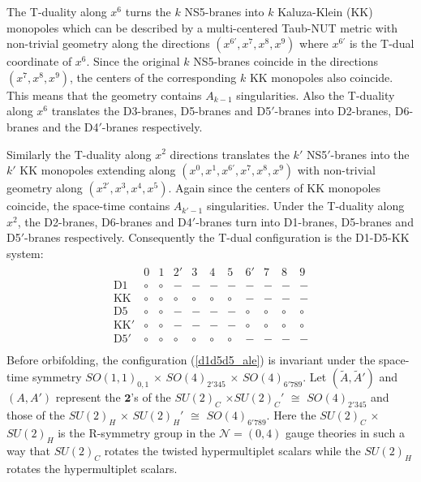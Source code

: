 \documentclass{article}
\numberwithin{equation}{section}
\begin{document}
The T-duality along $x^{6}$ turns the $k$ NS5-branes into $k$ Kaluza-Klein (KK) monopoles 
which can be described by a multi-centered Taub-NUT metric with non-trivial geometry along the directions $(x^{6'}, x^{7}, x^{8}, x^{9})$ 
where $x^{6'}$ is the T-dual coordinate of $x^{6}$. 
Since the original $k$ NS5-branes coincide in the directions $(x^{7}, x^{8}, x^{9})$, 
the centers of the corresponding $k$ KK monopoles also coincide. 
This means that the geometry contains $A_{k-1}$ singularities. 
Also the T-duality along $x^{6}$ translates the D3-branes, D5-branes and D5$'$-branes into 
D2-branes, D6-branes and the D4$'$-branes respectively. 

Similarly the T-duality along $x^{2}$ directions translates  
the $k'$ NS5$'$-branes into the $k'$ KK monopoles extending along $(x^{0}, x^{1}, x^{6'}, x^{7}, x^{8}, x^{9})$ 
with non-trivial geometry along $(x^{2'}, x^{3}, x^{4}, x^{5})$. 
Again since the centers of KK monopoles coincide, the space-time contains $A_{k'-1}$ singularities. 
Under the T-duality along $x^{2}$, 
the D2-branes, D6-branes and D4$'$-branes turn into D1-branes, D5-branes and D5$'$-branes respectively. 
Consequently the T-dual configuration is the D1-D5-KK system:
\begin{align}
\label{d1d5d5_ale}
\begin{array}{ccccccccccc}
&0&1&2'&3&4&5&6'&7&8&9\\
\textrm{D1}
&\circ&\circ&-&-&-&-&-&-&-&- \\
\textrm{KK}
&\circ&\circ&\circ&\circ&\circ&\circ&-&-&-&- \\
\textrm{D5}
&\circ&\circ&-&-&-&-&\circ&\circ&\circ&\circ \\
\textrm{KK$'$}
&\circ&\circ&-&-&-&-&\circ&\circ&\circ&\circ \\
\textrm{D5$'$}
&\circ&\circ&\circ&\circ&\circ&\circ&-&-&-&- \\
\end{array}
\end{align}
Before orbifolding, the configuration (\ref{d1d5d5_ale}) is invariant under 
the space-time symmetry $SO(1,1)_{0,1}$ $\times$ $SO(4)_{2'345}$ $\times$ $SO(4)_{6'789}$. 
Let $(\tilde{A}, \tilde{A}')$ and $(A, A')$ represent the $\bm{2}$'s of the 
 $SU(2)_{C}$ $\times SU(2)_{C}'$ $\cong$ $SO(4)_{2'345}$ 
 and those of the $SU(2)_{H}$ $\times$ $SU(2)_{H}'$ $\cong$ $SO(4)_{6'789}$. 
 Here the $SU(2)_{C}$ $\times$ $SU(2)_{H}$ is the R-symmetry group in the $\mathcal{N}=(0,4)$ gauge theories 
 in such a way that $SU(2)_{C}$ rotates the twisted hypermultiplet scalars 
 while the $SU(2)_{H}$ rotates the hypermultiplet scalars. 
 
\end{document}
